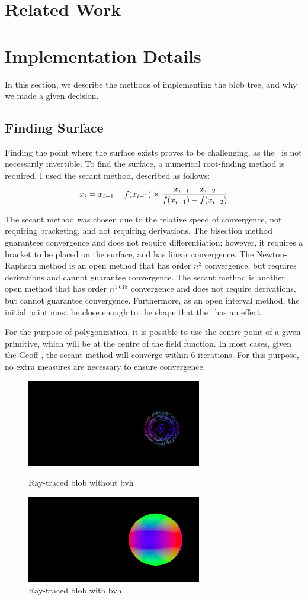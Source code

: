 \documentclass[conference]{acmsiggraph}
\begin{document}
\section{Related Work}

\section{Implementation Details}
In this section, we describe the methods of implementing the blob tree, and why
we made a given decision.
\subsection{Finding Surface}
Finding the point where the surface exists proves to be challenging, as the
\fff\ is not necessarily invertible. To find the surface, a numerical
root-finding method is required. I used the secant method, described as
follows:
$$x_i = x_{i-1} - f(x_{i-1}) \times {x_{i-1} - x_{i-2} \over f(x_{i-1}) -
f(x_{i-2})}$$

The secant method was chosen due to the relative speed of convergence, not
requiring bracketing, and not requiring derivations. The bisection method
guarantees convergence and does not require differentiation; however, it
requires a bracket to be placed on the surface, and has linear convergence. The
Newton-Raphson method is an open method that has order $n^2$ convergence, but
requires derivations and cannot guarantee convergence. The secant method is
another open method that has order $n^{1.618}$ convergence and does not require
derivations, but cannot guarantee convergence. Furthermore, as an open interval
method, the initial point must be close enough to the shape that the \fff\ has
an effect.

For the purpose of polygonization, it is possible to use the centre point of a
given primitive, which will be at the centre of the field function. In most
cases, given the Geoff \fff, the secant method will converge within 6
iterations. For this purpose, no extra measures are necessary to ensure
convergence.

\begin{figure}[htb]
	\centering
	\includegraphics[height=1.5in] {images/sphere_no_bvh.png}
	\caption{Ray-traced blob without bvh}
	\includegraphics[height=1.5in] {images/sphere_bvh.png}
	\caption{Ray-traced blob with bvh}
\end{figure}
\end{document}

